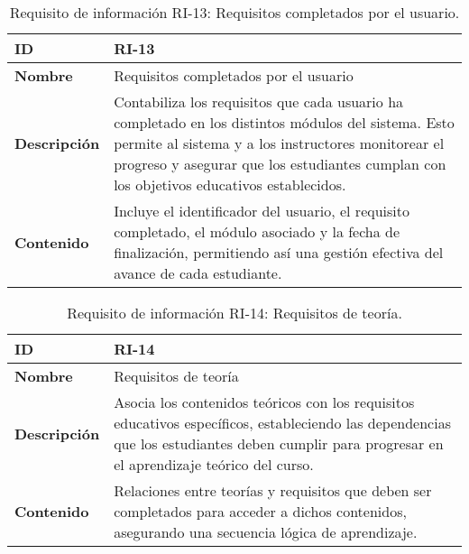 \begin{table}[H]
    \centering
    \begin{tabular}{|l|p{9.5cm}|}
        \hline
        \textbf{ID} & RI-13 \\
        \hline
        \textbf{Nombre} & Requisitos completados por el usuario \\
        \hline
        \textbf{Descripción} & Contabiliza los requisitos que cada usuario ha completado en los distintos módulos del sistema. Esto permite al sistema y a los instructores monitorear el progreso y asegurar que los estudiantes cumplan con los objetivos educativos establecidos.  \\
        \hline
        \textbf{Contenido} & Incluye el identificador del usuario, el requisito completado, el módulo asociado y la fecha de finalización, permitiendo así una gestión efectiva del avance de cada estudiante. \\
        \hline
    \end{tabular}
    \caption{Requisito de información RI-13: Requisitos completados por el usuario.}
    \label{table:req-RI15}
\end{table}

\begin{table}[H]
    \centering
    \begin{tabular}{|l|p{9.5cm}|}
        \hline
        \textbf{ID} & RI-14 \\
        \hline
        \textbf{Nombre} & Requisitos de teoría \\
        \hline
        \textbf{Descripción} & Asocia los contenidos teóricos con los requisitos educativos específicos, estableciendo las dependencias que los estudiantes deben cumplir para progresar en el aprendizaje teórico del curso.  \\
        \hline
        \textbf{Contenido} & Relaciones entre teorías y requisitos que deben ser completados para acceder a dichos contenidos, asegurando una secuencia lógica de aprendizaje. \\
        \hline
    \end{tabular}
    \caption{Requisito de información RI-14: Requisitos de teoría.}
    \label{table:req-RI16}
\end{table}

